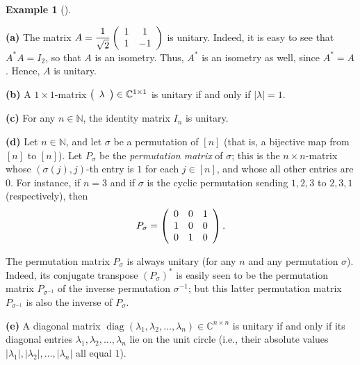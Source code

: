\documentclass[numbers=enddot,12pt,final,onecolumn,notitlepage]{scrartcl}%
\numberwithin{exer}{subsection}
\theoremstyle{definition}
\newtheorem{exam}[theo]{Example}
\newenvironment{example}[1][]
{\begin{exam}[#1]\begin{leftbar}}
{\end{leftbar}\end{exam}}
\begin{document}
\begin{example}
\label{exa.unitary.unitary.exas}\textbf{(a)} The matrix $A=\dfrac{1}{\sqrt{2}%
}\left(
\begin{array}
[c]{cc}%
1 & 1\\
1 & -1
\end{array}
\right)  $ is unitary. Indeed, it is easy to see that $A^{\ast}A=I_{2}$, so
that $A$ is an isometry. Thus, $A^{\ast}$ is an isometry as well, since
$A^{\ast}=A$. Hence, $A$ is unitary. \medskip

\textbf{(b)} A $1\times1$-matrix $\left(
\begin{array}
[c]{c}%
\lambda
\end{array}
\right)  \in\mathbb{C}^{1\times1}$ is unitary if and only if $\left\vert
\lambda\right\vert =1$. \medskip

\textbf{(c)} For any $n\in\mathbb{N}$, the identity matrix $I_{n}$ is unitary.
\medskip

\textbf{(d)} Let $n\in\mathbb{N}$, and let $\sigma$ be a permutation of
$\left[  n\right]  $ (that is, a bijective map from $\left[  n\right]  $ to
$\left[  n\right]  $). Let $P_{\sigma}$ be the \emph{permutation matrix} of
$\sigma$; this is the $n\times n$-matrix whose $\left(  \sigma\left(
j\right)  ,j\right)  $-th entry is $1$ for each $j\in\left[  n\right]  $, and
whose all other entries are $0$. For instance, if $n=3$ and if $\sigma$ is the
cyclic permutation sending $1,2,3$ to $2,3,1$ (respectively), then%
\[
P_{\sigma}=\left(
\begin{array}
[c]{ccc}%
0 & 0 & 1\\
1 & 0 & 0\\
0 & 1 & 0
\end{array}
\right)  .
\]


The permutation matrix $P_{\sigma}$ is always unitary (for any $n$ and any
permutation $\sigma$). Indeed, its conjugate transpose $\left(  P_{\sigma
}\right)  ^{\ast}$ is easily seen to be the permutation matrix $P_{\sigma
^{-1}}$ of the inverse permutation $\sigma^{-1}$; but this latter permutation
matrix $P_{\sigma^{-1}}$ is also the inverse of $P_{\sigma}$. \medskip

\textbf{(e)} A diagonal matrix $\operatorname*{diag}\left(  \lambda
_{1},\lambda_{2},\ldots,\lambda_{n}\right)  \in\mathbb{C}^{n\times n}$ is
unitary if and only if its diagonal entries $\lambda_{1},\lambda_{2}%
,\ldots,\lambda_{n}$ lie on the unit circle (i.e., their absolute values
$\left\vert \lambda_{1}\right\vert ,\left\vert \lambda_{2}\right\vert
,\ldots,\left\vert \lambda_{n}\right\vert $ all equal $1$).
\end{example}
\end{document}
